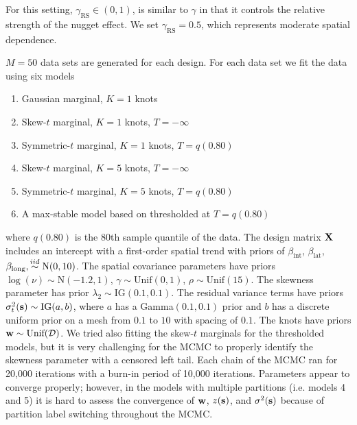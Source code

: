 \documentclass[useAMS,usenatbib,referee]{biom}
\providecommand{\DIFadd}[1]{{\protect\color{blue}\uwave{#1}}} %
\providecommand{\DIFdel}[1]{{\protect\color{red}\sout{#1}}}                      %
\providecommand{\DIFaddbegin}{} %
\providecommand{\DIFaddend}{} %
\providecommand{\DIFdelbegin}{} %
\providecommand{\DIFdelend}{} %
\begin{document}
For this setting, $\gamma_{\text{RS}} \in (0, 1)$, is similar to $\gamma$ in that it controls the relative strength of the nugget effect.
We set $\gamma_{\text{RS}} = 0.5$, which represents moderate spatial dependence.

$M = 50$ data sets are generated for each design.
For each data set we fit the data using six models
 \begin{enumerate} [leftmargin=3em]
  \item Gaussian marginal, $K=1$ knots
  \item Skew-$t$ marginal, $K=1$ knots, $T=-\infty$
  \item Symmetric-$t$ marginal, $K=1$ knots, $T=q(0.80)$
  \item Skew-$t$ marginal, $K=5$ knots, $T=-\infty$
  \item Symmetric-$t$ marginal, $K=5$ knots, $T=q(0.80)$
  \item A max-stable model based on \citet{Reich2012} thresholded at $T = q(0.80)$
 \end{enumerate} 
where $q(0.80)$ is the 80th sample quantile of the data.
The design matrix $\mbox{\bf X}$ includes an intercept with a first-order spatial trend with priors of $\beta_\text{int}$, $\beta_\text{lat}$, $\beta_\text{long},  \stackrel{iid}{\sim} \text{N}(0, 10)$.
The spatial covariance parameters have priors $\log(\nu) \sim \text{N}(-1.2, 1)$, $\gamma \sim \text{Unif}(0, 1)$, \DIFdelbegin \DIFdel{$\rho \sim \text{Unif}(15)$}\DIFdelend \DIFaddbegin \DIFadd{$\varphi \sim \text{Unif}(15)$}\DIFaddend .
The skewness parameter has prior \DIFdelbegin \DIFdel{$\lambda_2 \sim \text{IG}(0.1, 0.1)$}\DIFdelend \DIFaddbegin \DIFadd{$\lambda \sim N(0, 20)$}\DIFaddend .
The residual variance terms have priors $\sigma^2_t(\mbox{\bf s}) \sim \text{IG}(a, b)$, where $a$ has a Gamma$(0.1, 0.1)$ prior and $b$ has a discrete uniform prior on a mesh from $0.1$ to $10$ with spacing of $0.1$.
The knots have priors $\bw \sim \text{Unif}(\calD)$.
We tried also fitting the skew-$t$ marginals for the thresholded models, but it is very challenging for the MCMC to properly identify the skewness parameter with a censored left tail.
Each chain of the MCMC ran for 20,000 iterations with a burn-in period of 10,000 iterations.
Parameters appear to converge properly; however, in the models with multiple partitions (i.e. models 4 and 5) it is hard to assess the convergence of $\mbox{\bf w}$, $z(\mbox{\bf s})$, and $\sigma^2(\mbox{\bf s})$ because of partition label switching throughout the MCMC.
\end{document}
